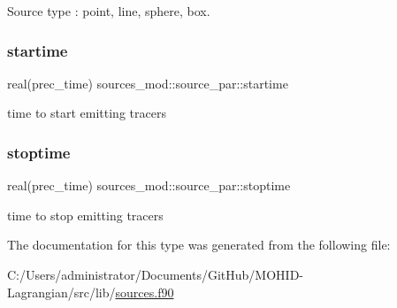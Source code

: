 Source type \+: \textquotesingle{}point\textquotesingle{}, \textquotesingle{}line\textquotesingle{}, \textquotesingle{}sphere\textquotesingle{}, \textquotesingle{}box\textquotesingle{}. 

\mbox{\label{structsources__mod_1_1source__par_afcde2655b2a557f3a3e2c952dc8a51b0}} 
\subsubsection{\texorpdfstring{startime}{startime}}
{\footnotesize\ttfamily real(prec\+\_\+time) sources\+\_\+mod\+::source\+\_\+par\+::startime\hspace{0.3cm}{\ttfamily [private]}}



time to start emitting tracers 

\mbox{\label{structsources__mod_1_1source__par_ac2c04f0d36ad034e160e3de15fe0c283}} 
\subsubsection{\texorpdfstring{stoptime}{stoptime}}
{\footnotesize\ttfamily real(prec\+\_\+time) sources\+\_\+mod\+::source\+\_\+par\+::stoptime\hspace{0.3cm}{\ttfamily [private]}}



time to stop emitting tracers 



The documentation for this type was generated from the following file\+:\begin{DoxyCompactItemize}
\item 
C\+:/\+Users/administrator/\+Documents/\+Git\+Hub/\+M\+O\+H\+I\+D-\/\+Lagrangian/src/lib/\hyperlink{sources_8f90}{sources.\+f90}\end{DoxyCompactItemize}

